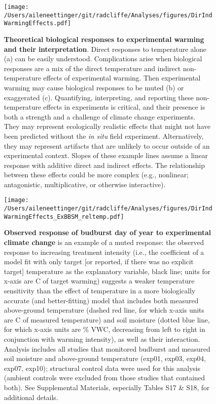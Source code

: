 \documentclass{article}
\begin{document}
 \begin{figure}[h]
\centering
 \texttt{[image: /Users/aileneettinger/git/radcliffe/Analyses/figures/DirIndWarmingEffects.pdf]} 
 \caption{\textbf{Theoretical biological responses to experimental warming and their interpretation}. Direct responses to temperature alone (a) can be easily understood. Complications arise when biological responses are a mix of the direct temperature and indirect non-temperature effects of experimental warming. Then experimental warming may cause biological responses to be muted (b) or exaggerated (c). Quantifying, interpreting, and reporting these non-temperature effects in experiments is critical, and their presence is both a strength and a challenge of climate change experiments. They may represent ecologically realistic effects that might not have been predicted without the \emph{in situ} field experiment. Alternatively, they may represent artifacts that are unlikely to occur outside of an experimental context. Slopes of these example lines assume a linear response with additive direct and indirect effects. The relationship between these effects could be more complex (e.g., nonlinear; antagonistic, multiplicative, or otherwise interactive).} 
\label{fig:biolimp}
\end{figure}

\begin{figure}[h]
\centering
 \texttt{[image: /Users/aileneettinger/git/radcliffe/Analyses/figures/DirIndWarmingEffects\_ExBBSM\_reltemp.pdf]} 
 \caption{\textbf{Observed response of budburst day of year to experimental climate change} is an example of a muted response: the observed response to increasing treatment intensity (i.e., the coefficient of a model fit with only target [or reported, if there was no explicit target] temperature as the explanatory variable, black line; units for x-axis are \degree C of target warming) suggests a weaker temperature sensitivity than the effect of temperature in a more biologically accurate (and better-fitting) model that includes both measured above-ground temperature (dashed red line, for which x-axis units are \degree C of measured temperature) and soil moisture (dotted blue line, for which x-axis units are \% VWC, decreasing from left to right in conjunction with warming intensity), as well as their interaction. Analysis includes all studies that monitored budburst and measured soil moisture and above-ground temperature (exp01, exp03, exp04, exp07, exp10); structural control data were used for this analysis (ambient controls were excluded from those studies that contained both). See Supplemental Materials, especially Tables S17 \& S18, for additional details.} 
 
\label{fig:phen}
\end{figure}
 

\end{document}
